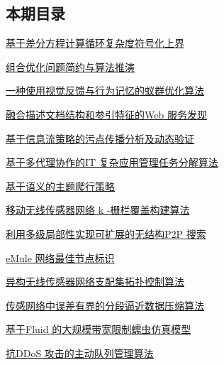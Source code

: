 \documentclass[a4paper]{article}
\begin{document}
\subsection{本期目录}
\href{http://www.jos.org.cn/ch/reader/download_pdf.aspx?file_no=3898&year_id=2011&quarter_id=9&falg=1}{基于差分方程计算循环复杂度符号化上界}

\href{http://www.jos.org.cn/ch/reader/download_pdf.aspx?file_no=3948&year_id=2011&quarter_id=9&falg=1}{组合优化问题简约与算法推演}

\href{http://www.jos.org.cn/ch/reader/download_pdf.aspx?file_no=3949&year_id=2011&quarter_id=9&falg=1}{一种使用视觉反馈与行为记忆的蚁群优化算法}

\href{http://www.jos.org.cn/ch/reader/download_pdf.aspx?file_no=3887&year_id=2011&quarter_id=9&falg=1}{融合描述文档结构和参引特征的Web 服务发现}

\href{http://www.jos.org.cn/ch/reader/download_pdf.aspx?file_no=3874&year_id=2011&quarter_id=9&falg=1}{基于信息流策略的污点传播分析及动态验证}

\href{http://www.jos.org.cn/ch/reader/download_pdf.aspx?file_no=3879&year_id=2011&quarter_id=9&falg=1}{基于多代理协作的IT 复杂应用管理任务分解算法}

\href{http://www.jos.org.cn/ch/reader/download_pdf.aspx?file_no=3876&year_id=2011&quarter_id=9&falg=1}{基于语义的主题爬行策略}

\href{http://www.jos.org.cn/ch/reader/download_pdf.aspx?file_no=3877&year_id=2011&quarter_id=9&falg=1}{移动无线传感器网络 k -栅栏覆盖构建算法}

\href{http://www.jos.org.cn/ch/reader/download_pdf.aspx?file_no=3878&year_id=2011&quarter_id=9&falg=1}{利用多级局部性实现可扩展的无结构P2P 搜索}

\href{http://www.jos.org.cn/ch/reader/download_pdf.aspx?file_no=3886&year_id=2011&quarter_id=9&falg=1}{eMule 网络最佳节点标识}

\href{http://www.jos.org.cn/ch/reader/download_pdf.aspx?file_no=3895&year_id=2011&quarter_id=9&falg=1}{异构无线传感器网络支配集拓扑控制算法}

\href{http://www.jos.org.cn/ch/reader/download_pdf.aspx?file_no=3951&year_id=2011&quarter_id=9&falg=1}{传感网络中误差有界的分段逼近数据压缩算法}

\href{http://www.jos.org.cn/ch/reader/download_pdf.aspx?file_no=3854&year_id=2011&quarter_id=9&falg=1}{基于Fluid 的大规模带宽限制蠕虫仿真模型}

\href{http://www.jos.org.cn/ch/reader/download_pdf.aspx?file_no=3920&year_id=2011&quarter_id=9&falg=1}{抗DDoS 攻击的主动队列管理算法}
\end{document}
